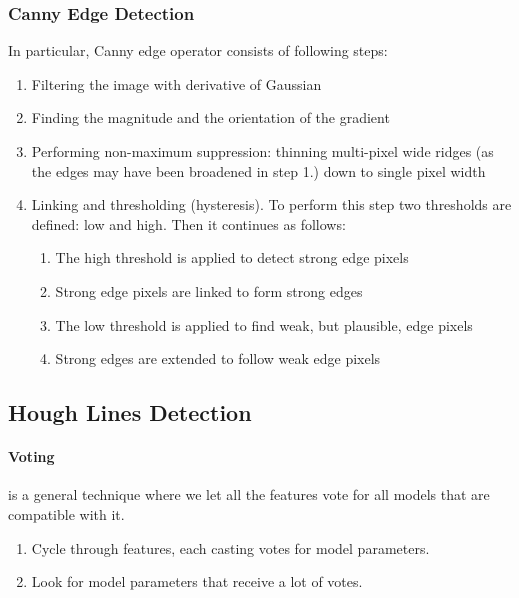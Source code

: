 \subsubsection{Canny Edge Detection}
In particular, Canny edge operator consists of following steps\cite{canny-edge}:
\begin{enumerate}
	\item Filtering the image with derivative of Gaussian
	\item Finding the magnitude and the orientation of the gradient
	\item Performing non-maximum suppression: thinning multi-pixel wide ridges (as the edges may have been broadened in step 1.) down to single pixel width
	\item Linking and thresholding (hysteresis). To perform this step two thresholds are defined: low and high. Then it continues as follows:
	\begin{enumerate}
		\item The high threshold is applied to detect strong edge pixels
		\item Strong edge pixels are linked to form strong edges
		\item The low threshold is applied to find weak, but plausible, edge pixels
		\item Strong edges are extended to follow weak edge pixels
	\end{enumerate}
\end{enumerate}

\subsection{Hough Lines Detection}
\paragraph{Voting}
is a general technique where we let all the features vote for all models that are compatible with it.
\begin{enumerate}
	\item Cycle through features, each casting votes for model parameters.
	\item Look for model parameters that receive a lot of votes.
\end{enumerate}

